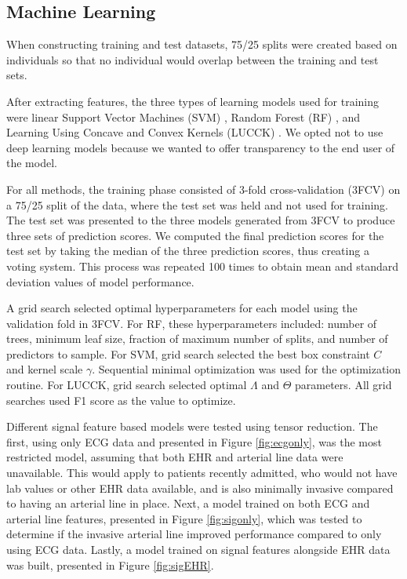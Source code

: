 \subsection*{Machine Learning} \label{sec:methods_ml}
When constructing training and test datasets, 75/25 splits were created based on individuals so that no individual would overlap between the training and test sets.

After extracting features, the three types of learning models used for training were linear Support Vector Machines (SVM) \autocite{cortes_support-vector_1995}, Random Forest (RF) \autocite{breiman_random_2001}, and Learning Using Concave and Convex Kernels (LUCCK) \autocite{sabeti_learning_2019}. We opted not to use deep learning models because we wanted to offer transparency to the end user of the model. 

For all methods, the training phase consisted of 3-fold cross-validation (3FCV) on a 75/25 split of the data, where the test set was held and not used for training. The test set was presented to the three models generated from 3FCV to produce three sets of prediction scores. We computed the final prediction scores for the test set by taking the median of the three prediction scores, thus creating a voting system. This process was repeated 100 times to obtain mean and standard deviation values of model performance. 

A grid search selected optimal hyperparameters for each model using the validation fold in 3FCV. For RF, these hyperparameters included: number of trees, minimum leaf size, fraction of maximum number of splits, and number of predictors to sample. For SVM, grid search selected the best box constraint $C$ and kernel scale $\gamma$. Sequential minimal optimization \autocite{JMLR:v6:fan05a} was used for the optimization routine. For LUCCK, grid search selected optimal $\Lambda$ and $\Theta$ parameters. All grid searches used F1 score as the value to optimize. 

Different signal feature based models were tested using tensor reduction. The first, using only ECG data and presented in Figure \ref{fig:ecgonly}, was the most restricted model, assuming that both EHR and arterial line data were unavailable. This would apply to patients recently admitted, who would not have lab values or other EHR data available, and is also minimally invasive compared to having an arterial line in place. Next, a model trained on both ECG and arterial line features, presented in Figure \ref{fig:sigonly}, which was tested to determine if the invasive arterial line improved performance compared to only using ECG data. Lastly, a model trained on signal features alongside EHR data was built, presented in Figure \ref{fig:sigEHR}.

